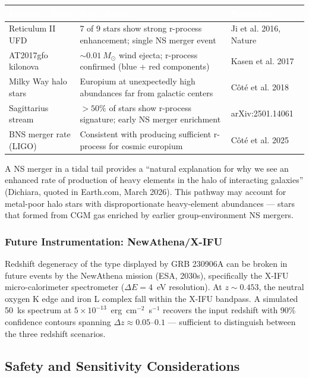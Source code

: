 \documentclass[11pt,letterpaper]{article}
\newcommand{\tableheader}[1]{\textbf{\sffamily\textcolor{white}{#1}}}
\begin{document}
\begin{center}
\begin{tabularx}{\textwidth}{L{4cm}XL{3.5cm}}
\toprule
{}
\tableheader{Evidence Type} & \tableheader{Key Finding} & \tableheader{Reference} \\
\midrule
Reticulum II UFD & 7 of 9 stars show strong r-process enhancement; single NS merger event & Ji et al. 2016, Nature \\
AT2017gfo kilonova & $\sim 0.01~M_\odot$ wind ejecta; r-process confirmed (blue + red components) & Kasen et al. 2017 \\
Milky Way halo stars & Europium at unexpectedly high abundances far from galactic centers & Côté et al. 2018 \\
Sagittarius stream & $>50\%$ of stars show r-process signature; early NS merger enrichment & arXiv:2501.14061 \\
BNS merger rate (LIGO) & Consistent with producing sufficient r-process for cosmic europium & Côté et al. 2025 \\
\bottomrule
\end{tabularx}
\end{center}

A NS merger in a tidal tail provides a ``natural explanation for why we see an enhanced rate of production of heavy elements in the halo of interacting galaxies'' (Dichiara, quoted in Earth.com, March 2026). This pathway may account for metal-poor halo stars with disproportionate heavy-element abundances --- stars that formed from CGM gas enriched by earlier group-environment NS mergers.

\subsubsection{Future Instrumentation: NewAthena/X-IFU}

Redshift degeneracy of the type displayed by GRB 230906A can be broken in future events by the NewAthena mission (ESA, 2030s), specifically the X-IFU micro-calorimeter spectrometer ($\Delta E = 4$~eV resolution). At $z \sim 0.453$, the neutral oxygen K edge and iron L complex fall within the X-IFU bandpass. A simulated 50~ks spectrum at $5 \times 10^{-13}$~erg~cm$^{-2}$~s$^{-1}$ recovers the input redshift with 90\% confidence contours spanning $\Delta z \approx 0.05$--$0.1$ --- sufficient to distinguish between the three redshift scenarios.

\subsection{Safety and Sensitivity Considerations}
\end{document}

